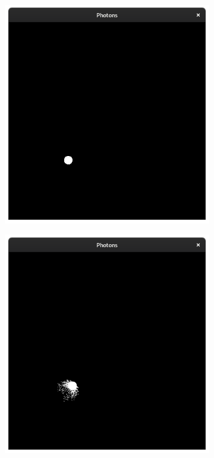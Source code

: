 \documentclass{stdlocal}
\begin{document}
    \begin{figure}[p]
      \center
      \begin{subfigure}[b]{0.24\textwidth}
        \center
        \includegraphics[width=\textwidth,trim={0 0 0 2cm},clip]{images/photons_1_01.png}
      \end{subfigure}
      \begin{subfigure}[b]{0.24\textwidth}
        \center
        \includegraphics[width=\textwidth,trim={0 0 0 2cm},clip]{images/photons_1_02.png}

\end{subfigure}
\end{figure}
\end{document}
